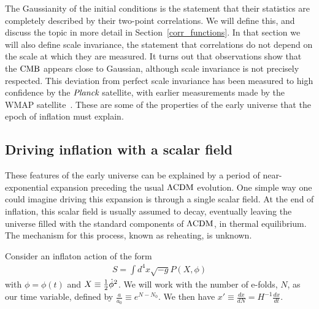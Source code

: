     The Gaussianity of the initial conditions is the statement that their statistics are completely described by
    their two-point correlations. We will define this, and discuss the topic in more detail
    in Section~\ref{corr_functions}. In that section we will also define scale invariance,
    the statement that correlations do not depend on the scale at which they are measured.
    It turns out that observations show that the $\text{CMB}$ appears close to Gaussian, although
    scale invariance is not precisely respected.
    This deviation from perfect scale invariance has been measured to high confidence by the $\textit{Planck}$
    satellite, with
    earlier measurements made by the WMAP satellite~\cite{Senatore_wmap_2009}.
    These are some of the properties of the early universe that the epoch of inflation
    must explain.


    \subsection{Driving inflation with a scalar field}
    These features of the early universe can be explained by a period of near-exponential expansion
    preceding the usual $\Lambda\text{CDM}$ evolution.
    One simple way one could imagine driving this expansion is through a single
    scalar field.
    At the end of inflation, this scalar field is usually assumed to decay,
    eventually leaving the universe filled with the standard components of $\Lambda\text{CDM}$,
    in thermal equilibrium. The mechanism for this process, known as reheating, is unknown.


Consider an inflaton action of the form
\begin{align}\label{inflaton_action}
S = \int d^4x \sqrt{-g}P(X,\phi)
\end{align}
with $\phi=\phi(t)$ and $X\equiv\frac{1}{2}\dot{\phi}^2$.
We will work with the number of e-folds, $N$, as our time variable,
defined by $\frac{a}{a_0}\equiv e^{N-N_0}$.
We then have
$x'\equiv\frac{dx}{dN}=H^{-1}\frac{dx}{dt}$.


